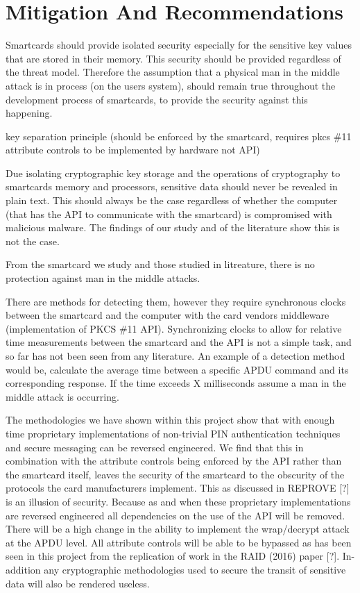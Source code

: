 \documentclass[bsc,frontabs,twoside,singlespacing,parskip,deptreport]{infthesis}     %
\begin{document}
\section{Mitigation And Recommendations}

Smartcards should provide isolated security especially for the sensitive key values that are stored in their memory. This security should be provided regardless of the threat model. Therefore the assumption that a physical man in the middle attack is in process (on the users system), should remain true throughout the development process of smartcards, to provide the security against this happening.

key separation principle (should be enforced by the smartcard, requires pkcs \#11 attribute controls to be implemented by hardware not API)

Due isolating cryptographic key storage and the operations of cryptography to smartcards memory and processors, sensitive data should never be revealed in plain text. This should always be the case regardless of whether the computer (that has the API to communicate with the smartcard) is compromised with malicious malware. The findings of our study and of the literature show this is not the case.

From the smartcard we study and those studied in litreature, there is no protection against man in the middle attacks.

There are methods for detecting them, however they require synchronous clocks between the smartcard and the computer with the card vendors middleware (implementation of PKCS \#11 API). Synchronizing clocks to allow for relative time measurements between the smartcard and the API is not a simple task, and so far has not been seen from any literature. An example of a detection method would be, calculate the average time between a specific APDU command and its corresponding response. If the time exceeds X milliseconds assume a man in the middle attack is occurring. 

The methodologies we have shown within this project show that with enough time proprietary implementations of non-trivial PIN authentication techniques and secure messaging can be reversed engineered. We find that this in combination with the attribute controls being enforced by the API rather than the smartcard itself, leaves the security of the smartcard to the obscurity of the protocols the card manufacturers implement. This as discussed in REPROVE [?] is an illusion of security. Because as and when these proprietary implementations are reversed engineered all dependencies on the use of the API will be removed. There will be a high change in the ability to implement the wrap/decrypt attack at the APDU level. All attribute controls will be able to be bypassed as has been seen in this project from the replication of work in the RAID (2016) paper [?]. In-addition any cryptographic methodologies used to secure the transit of sensitive data will also be rendered useless.
\end{document}

